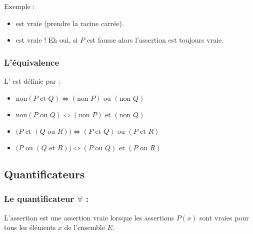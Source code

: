\documentclass[11pt,class=report,crop=false]{standalone}
\begin{document}
Exemple :
\begin{itemize}
  \item {}  est vraie (prendre la racine carrée).
  \item {}  est vraie ! Eh oui, si
$P$ est fausse alors l'assertion  est toujours vraie.
\end{itemize}



\subsubsection*{L'équivalence}


L' est définie par :

\begin{proposition}
\sauteligne
\begin{itemize}
  \item \emph{$\text{non}(P \text{ et } Q)  \iff  (\text{non } P)  \text{ ou } (\text{non }Q)$}
  \item \emph{$\text{non}(P \text{ ou } Q)  \iff  (\text{non } P)  \text{ et } (\text{non }Q)$}
  \item \emph{$\big(P \text{ et } (Q \text{ ou } R)  \big)   \iff
(P \text{ et } Q) \text{ ou } (P \text{ et }  R)$}
  \item \emph{$\big(P \text{ ou } (Q \text{ et } R)  \big)   \iff
(P \text{ ou } Q) \text{ et } (P \text{ ou }  R)$}
\end{itemize}
\end{proposition}



\subsection{Quantificateurs}

\subsubsection*{Le quantificateur $\forall$ : }
\index{$\forall$}


L'assertion 
est une assertion vraie lorsque les assertions $P(x)$ sont vraies pour tous les éléments $x$
de l'ensemble $E$.
\end{document}
